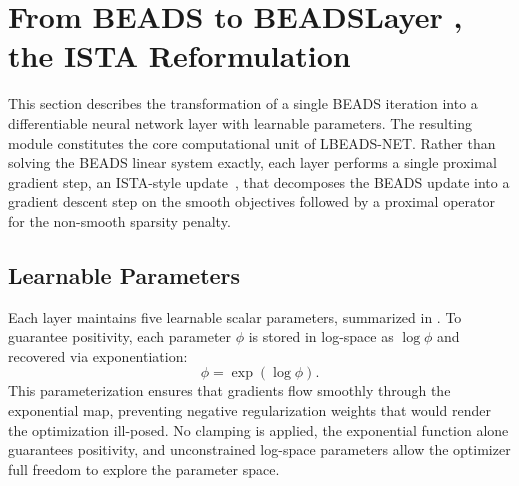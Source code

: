 \section{From BEADS to BEADSLayer ,  the ISTA Reformulation}
\label{sec:method_beadslayer}

This section describes the transformation of a single BEADS iteration into a differentiable neural network layer with learnable parameters. The resulting module constitutes the core computational unit of LBEADS-NET. Rather than solving the BEADS linear system exactly, each layer performs a single proximal gradient step, an ISTA-style update~\cite{daubechies2004ista, beck2009fista}, that decomposes the BEADS update into a gradient descent step on the smooth objectives followed by a proximal operator for the non-smooth sparsity penalty.


\subsection{Learnable Parameters}
\label{sec:method_params}

Each layer maintains five learnable scalar parameters, summarized in . To guarantee positivity, each parameter $\phi$ is stored in log-space as $\log \phi$ and recovered via exponentiation:
\begin{equation}
    \phi = \exp(\log \phi).
    \label{eq:log_space_param}
\end{equation}
This parameterization ensures that gradients flow smoothly through the exponential map, preventing negative regularization weights that would render the optimization ill-posed. No clamping is applied, the exponential function alone guarantees positivity, and unconstrained log-space parameters allow the optimizer full freedom to explore the parameter space.

